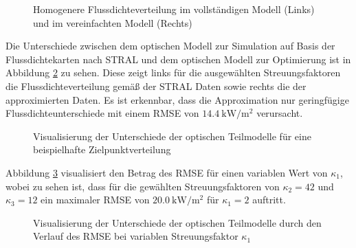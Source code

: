 \enlargethispage{\baselineskip}
\begin{figure}[h!]
    \centering
    \setlength{\fboxsep}{1pt}
    \setlength{\fboxrule}{1pt}
    \caption[Homogenere Flussdichteverteilung im vollständigen Modell und im vereinfachten Modell]{Homogenere Flussdichteverteilung im vollständigen Modell (Links) und im vereinfachten Modell (Rechts)}
    \label{fig_dispersionSTRAL36300605}
\end{figure}

Die Unterschiede zwischen dem optischen Modell zur Simulation auf Basis der Flussdichtekarten nach STRAL und dem optischen Modell zur Optimierung ist in Abbildung \ref{fig_UnterschiedoptischeModelle} zu sehen.
Diese zeigt links für die ausgewählten Streuungsfaktoren die Flussdichteverteilung gemäß der STRAL Daten sowie rechts die der approximierten Daten.
Es ist erkennbar, dass die Approximation nur geringfügige Flussdichteunterschiede mit einem RMSE von $\SI{14.4}{\kilo\watt\per\metre\squared}$ verursacht.


\begin{figure}[h!]
    \centering
    \setlength{\fboxsep}{1pt}
    \setlength{\fboxrule}{1pt}
    \caption[Visualisierung der Unterschiede der optischen Teilmodelle für eine beispielhafte Zielpunktverteilung]{Visualisierung der Unterschiede der optischen Teilmodelle für eine beispielhafte Zielpunktverteilung}
    \label{fig_UnterschiedoptischeModelle}
\end{figure}

Abbildung \ref{fig_RMSEüberdispersion} visualisiert den Betrag des RMSE für einen variablen Wert von $\kappa_1$, wobei zu sehen ist, dass für die gewählten Streuungsfaktoren von $\kappa_2 = 42$ und $\kappa_3 = 12$ ein maximaler RMSE von $\SI{20.0}{\kilo\watt\per\metre\squared}$ für $\kappa_1 = 2$ auftritt.

\begin{figure}[h!]
    \centering
    \setlength{\fboxsep}{1pt}
    \setlength{\fboxrule}{1pt}
    \caption[Visualisierung der Unterschiede der optischen Teilmodelle durch den Verlauf des RMSE bei variablen Streuungsfaktor $\kappa_1$]{Visualisierung der Unterschiede der optischen Teilmodelle durch den Verlauf des RMSE bei variablen Streuungsfaktor $\kappa_1$}
    \label{fig_RMSEüberdispersion}
\end{figure}


